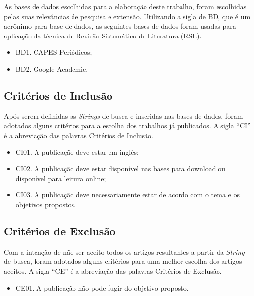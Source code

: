 As bases de dados escolhidas para a elaboração deste trabalho, foram escolhidas pelas suas relevâncias de pesquisa e extensão. Utilizando a sigla de BD, que é um acrônimo para base de dados, as seguintes bases de dados foram usadas para aplicação da técnica de Revisão Sistemática de Literatura (RSL).

\begin{itemize}
    \item BD1. CAPES Periódicos;
    \item BD2. Google Academic.
\end{itemize} 

\subsection{Critérios de Inclusão}
\label{subsec:inclusao}

Após serem definidas as \textit{Strings} de busca e inseridas nas bases de dados, foram adotados alguns critérios para a escolha dos trabalhos já publicados. A sigla “CI” é a abreviação das palavras Critérios de Inclusão.

\begin{itemize}
    \item CI01. A publicação deve estar em inglês;
    \item CI02. A publicação deve estar disponível nas bases para download ou disponível para leitura online;
    \item CI03. A publicação deve necessariamente estar de acordo com o tema e os objetivos propostos.
\end{itemize}

\subsection{Critérios de Exclusão}
\label{subsec:exclusao}

Com a intenção de não ser aceito todos os artigos resultantes a partir da \textit{String} de busca, foram adotados alguns critérios para uma melhor escolha dos artigos aceitos. A sigla “CE” é a abreviação das palavras Critérios de Exclusão. 

\begin{itemize}
    \item CE01. A publicação não pode fugir do objetivo proposto.
\end{itemize}